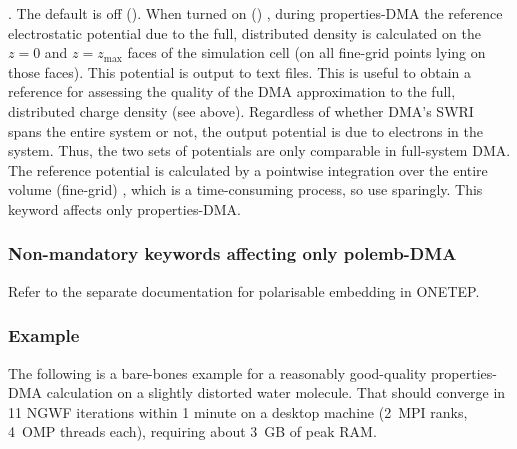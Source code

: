 \documentclass[letterpaper,10pt,english]{sphinxmanual}
\begin{document}
. The default is off
(). When turned on ()   , during properties-DMA the reference electrostatic potential due to
the full, distributed  density is calculated on the
\(z=0\) and \(z=z_\textrm{max}\) faces of the simulation cell
(on all fine-grid points lying on those faces). This potential is output
to text files. This is useful to obtain a reference for assessing the
quality of the DMA approximation to the full, distributed charge density
(see above). Regardless of whether DMA’s SWRI spans the entire system or
not, the output potential is due to  electrons in the system. Thus,
the two sets of potentials are only comparable in full-system DMA. The
reference potential is calculated by a pointwise integration over the
entire volume (fine-grid) , which is a
time-consuming process, so use sparingly. This keyword affects only
properties-DMA.


\subsubsection{Non-mandatory keywords affecting only polemb-DMA}
\label{\detokenize{hfx:non-mandatory-keywords-affecting-only-polemb-dma}}
Refer to the separate documentation for polarisable embedding in ONETEP.


\subsubsection{Example}
\label{\detokenize{hfx:id19}}
The following is a bare-bones example for a reasonably good-quality
properties-DMA calculation on a slightly distorted water molecule. That
should converge in 11 NGWF iterations within 1 minute on a desktop
machine (2 MPI ranks, 4 OMP threads each), requiring about 3 GB of peak
RAM.
\end{document}
